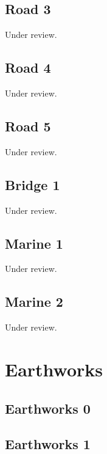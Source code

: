 \documentclass{scrartcl}
\begin{document}
\subsection{Road 3}
\label{sec:road_3}
Under review.%
\clearpage

\subsection{Road 4}
\label{sec:road_4}
Under review.%
\clearpage

\subsection{Road 5}
\label{sec:road_5}
Under review.%
\clearpage

\subsection{Bridge 1}
\label{sec:bridge_1}
Under review.%
\clearpage

\subsection{Marine 1}
\label{sec:marine_1}
Under review.%
\clearpage

\subsection{Marine 2}
\label{sec:marine_2}
Under review.%
\clearpage

\section{Earthworks}

\subsection{Earthworks 0}
\label{sec:earth_0}
\clearpage

\subsection{Earthworks 1}
\label{sec:earth_1}
\clearpage
\end{document}
